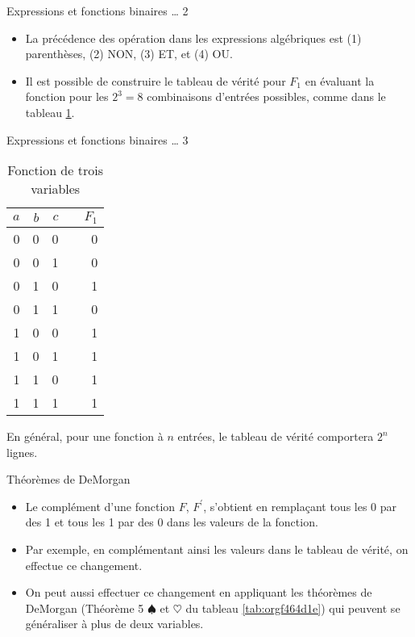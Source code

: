 \documentclass[presentation]{beamer}
\begin{document}
\begin{frame}[label={sec:org854879e}]{Expressions et fonctions binaires \ldots{} 2}
\begin{itemize}
\item La précédence des opération dans les expressions algébriques est (1) parenthèses, (2) NON, (3) ET, et (4) OU.

\item Il est possible de construire le tableau de vérité pour \(F_1\) en évaluant la fonction pour les \(2^3 = 8\) combinaisons d'entrées possibles, comme dans le tableau \ref{tab:org724446f}.
\end{itemize}
\end{frame}

\begin{frame}[label={sec:org2d20f76}]{Expressions et fonctions binaires \ldots{} 3}
\begin{table}[htbp]
\caption{\label{tab:org724446f}Fonction de trois variables}
\centering
\begin{tabular}{rrrlr}
\(a\) & \(b\) & \(c\) &  & \(F_1\)\\
\hline
0 & 0 & 0 &  & 0\\
0 & 0 & 1 &  & 0\\
0 & 1 & 0 &  & 1\\
0 & 1 & 1 &  & 0\\
1 & 0 & 0 &  & 1\\
1 & 0 & 1 &  & 1\\
1 & 1 & 0 &  & 1\\
1 & 1 & 1 &  & 1\\
\end{tabular}
\end{table}

En général, pour une fonction à \(n\) entrées, le tableau de vérité
comportera \(2^n\) lignes.
\end{frame}

\begin{frame}[label={sec:org56a1515}]{Théorèmes de DeMorgan}
\begin{itemize}
\item Le complément d'une fonction \(F\), \(F^\prime\), s'obtient en remplaçant tous les 0 par des 1 et tous les 1 par des 0 dans les valeurs de la fonction.

\item Par exemple, en complémentant ainsi les valeurs dans le tableau de vérité, on effectue ce changement.

\item On peut aussi effectuer ce changement en appliquant les théorèmes de DeMorgan (Théorème 5 \(\spadesuit\) et \(\heartsuit\) du tableau \ref{tab:orgf464d1e}) qui peuvent se généraliser à plus de deux variables.
\end{itemize}
\end{frame}
\end{document}
